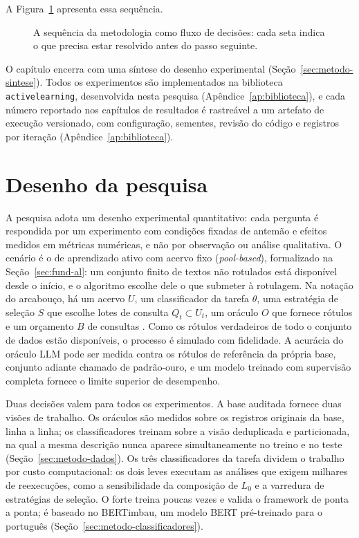 A Figura~\ref{fig:metodo-sequencia} apresenta essa sequência.

\begin{figure}[htbp]
    \centering
    
    \caption{A sequência da metodologia como fluxo de decisões: cada seta
    indica o que precisa estar resolvido antes do passo seguinte.}
    \label{fig:metodo-sequencia}
\end{figure}

O capítulo encerra com uma síntese do desenho experimental
(Seção~\ref{sec:metodo-sintese}). Todos os experimentos são
implementados na biblioteca \texttt{activelearning}, desenvolvida nesta
pesquisa (Apêndice~\ref{ap:biblioteca}), e cada número reportado nos
capítulos de resultados é rastreável a um artefato de execução versionado,
com configuração, sementes, revisão do código e registros por iteração
(Apêndice~\ref{ap:biblioteca}).

\section{Desenho da pesquisa}
\label{sec:metodo-desenho}

A pesquisa adota um desenho experimental quantitativo: cada pergunta é
respondida por um experimento com condições fixadas de antemão e efeitos
medidos em métricas numéricas, e não por observação ou análise qualitativa.
O cenário é o de aprendizado ativo com acervo fixo (\textit{pool-based}),
formalizado na Seção~\ref{sec:fund-al}: um conjunto finito de textos não
rotulados está disponível desde o início, e o algoritmo escolhe dele o que
submeter à rotulagem. Na notação do arcabouço, há um acervo $U$, um
classificador da tarefa $\theta$, uma estratégia de seleção $S$ que
escolhe lotes de consulta $Q_t \subset U_t$, um oráculo $O$ que fornece rótulos e um
orçamento $B$ de consultas \citep{Lewis1994,Settles2012}. Como os rótulos verdadeiros de todo o conjunto de dados
estão disponíveis, o processo é simulado com fidelidade. A acurácia do
oráculo LLM pode ser medida contra os rótulos de referência da própria
base, conjunto adiante chamado de padrão-ouro, e um modelo treinado com
supervisão completa fornece o limite superior de desempenho.

Duas decisões valem para todos os experimentos. A base auditada fornece
duas visões de trabalho. Os oráculos são medidos sobre os registros
originais da base, linha a linha; os classificadores treinam sobre a visão
deduplicada e particionada, na qual a mesma descrição nunca aparece
simultaneamente no treino e no teste (Seção~\ref{sec:metodo-dados}). Os três classificadores da
tarefa dividem o trabalho por custo computacional: os dois leves executam
as análises que exigem milhares de reexecuções, como a sensibilidade da
composição de $L_0$ e a varredura de estratégias de seleção. O forte treina
poucas vezes e valida o framework de ponta a ponta; é baseado no BERTimbau,
um modelo BERT pré-treinado para o português
(Seção~\ref{sec:metodo-classificadores}).

